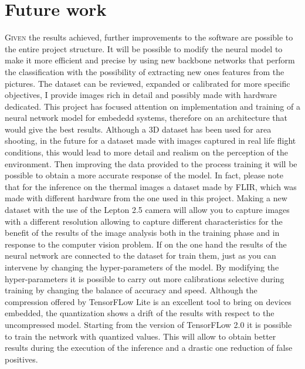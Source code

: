 \chapter{Future work}
\label{chap:future-work}
%
\lettrine[lines=3]{G}{iven} the results achieved, further improvements to the 
software are possible to the entire project structure. 
It will be possible to modify the neural model to make it more efficient and
precise by using new backbone networks that perform the classification with the
possibility of extracting new ones features from the pictures.
The dataset can be reviewed, expanded or calibrated for more specific
objectives, I provide images rich in detail and possibly made with hardware
dedicated.
This project has focused attention on implementation and training
of a neural network model for embededd systems, therefore on an architecture that
would give the best results.
Although a 3D dataset has been used for area shooting, in the future
for a dataset made with images captured in real life flight conditions, this
would lead to more detail and realism on the perception of the environment. 
Then improving the data provided to the process training it will be possible to
obtain a more accurate response of the model. 
In fact, please note that for the inference on the thermal images a dataset made
by FLIR, which was made with different hardware from the one used in this
project.
Making a new dataset with the use of the Lepton 2.5 camera will allow you to
capture images with a different resolution allowing to capture different
characteristics for the benefit of the results of the image analysis both in the
training phase and in response to the computer vision problem.
If on the one hand the results of the neural network are connected to the
dataset for train them, just as you can intervene by changing the
hyper-parameters of the model.
By modifying the hyper-parameters it is possible to carry out more calibrations
selective during training by changing the balance of accuracy and speed.
Although the compression offered by TensorFLow Lite is an excellent tool to
bring on devices embedded, the quantization shows a drift of the results with
respect to the uncompressed model.
Starting from the version of TensorFLow 2.0 it is possible to train the network
with quantized values. This will allow to obtain better results during the
execution of the inference and a drastic one reduction of false positives.
